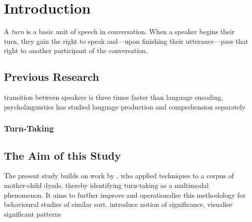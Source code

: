 
\chapter{Introduction}
A \emph{turn} is a basic unit of speech in conversation. When a speaker begins their turn, they gain the right to speak and---upon finishing their utterance---pass that right to another participant of the conversation.

\section{Previous Research}
\cite{levinson16} transition between speakers is three times faster than language encoding, psycholinguistics has studied language production and comprehension separately

\subsection{Turn-Taking}
\cite{stivers09}

\subsection{\fpm}



\section{The Aim of this Study}
The present study builds on work by , who applied \fpm{} techniques to a corpus of mother-child dyads, thereby identifying turn-taking as a multimodal phenomenon. It aims to further improve and operationalise this methodology for behavioural studies of similar sort.
introduce notion of significance, visualise significant patterns


























